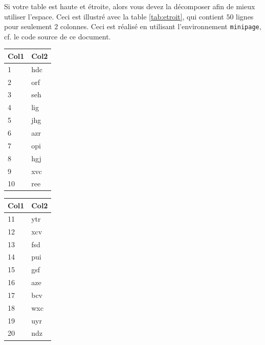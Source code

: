 \documentclass{ceri}
\begin{document}
Si votre table est haute et étroite, alors vous devez la décomposer afin de mieux utiliser l'espace. Ceci est illustré avec la table \ref{tab:etroit}, qui contient $50$ lignes pour seulement $2$ colonnes. Ceci est réalisé en utilisant l'environnement \texttt{minipage}, cf. le code source de ce document.
\begin{table}[htb]
	\begin{minipage}[t]{0.19\linewidth}
		\centering
		\begin{tabular}{l l}
			\hline
			\rowcolor{DarkColor} 
			\textbf{Col1} 			& \textbf{Col2} \\ 
			\hline
			1 & hdc \\
			2 & orf \\
			3 & seh \\
			4 & lig \\
			5 & jhg \\
			6 & azr \\
			7 & opi \\
			8 & hgj \\
			9 & xvc \\
			10 & ree \\
			\hline
		\end{tabular}
	\end{minipage}
	\begin{minipage}[t]{0.19\linewidth}
		\centering
		\begin{tabular}{l l}
			\hline
			\rowcolor{DarkColor} 
			\textbf{Col1} 			& \textbf{Col2} \\ 
			\hline
			11 & ytr \\
			12 & xcv \\
			13 & fsd \\
			14 & pui \\
			15 & gsf \\
			16 & aze \\
			17 & bcv \\
			18 & wxc \\
			19 & uyr \\
			20 & ndz \\
			\hline
		\end{tabular}
	\end{minipage}

\end{table}
\end{document}
